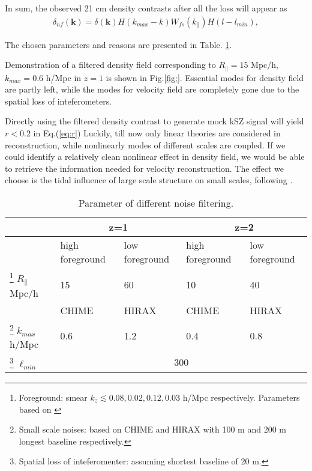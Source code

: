 In sum, the observed 21 cm density contrasts after all the loss will appear as 
\begin{eqnarray}
\label{eq:ns}
    \delta_{nf}(\bm{k})=\delta(\bm{k})H(k_{max}-k)W_{fs}(k_\parallel)H(l-l_{min}),
\end{eqnarray}

The chosen parameters and reasons are presented in Table. \ref{tab:para}.

Demonstration of a filtered density field corresponding to 
$R_\parallel=15$ Mpc/h, $k_{max}=0.6$ h/Mpc 
in $z=1$ is shown in Fig.\ref{fig:}. 
Essential modes for density field are partly left,  
while the modes for velocity field are completely gone 
due to the spatial loss of inteferometers. 

Directly using the filtered density contrast to 
generate mock kSZ signal will yield $r<0.2$ in Eq.(\ref{eq:r}) 
Luckily, till now only linear theories are considered in reconstruction, 
while nonlinearly modes of different scales are coupled. 
If we could identify a relatively clean nonlinear effect in density field, 
we would be able to retrieve the information needed for velocity reconstruction. 
The effect we choose is the tidal influence of large scale structure on small 
scales, following \cite{2015:zhu,2012:pen}.  






\begin{table}
\begin{tabular}{|m{2cm}|m{1.5cm}|m{1.5cm}|m{1.5cm}|m{1.5cm}|}
    \hline
     & \multicolumn{2}{|c|}{z=1} &\multicolumn{2}{|c|}{z=2}\\
     \hline
     & high foreground &low foreground&high foreground& low foreground\\
     \cline{2-5}
     \footnote{Foreground: smear $k_z\lesssim 0.08,0.02,0.12,0.03$ h/Mpc respectively. Parameters based on \cite{2013ApJ...763L..20M,Switzer13,15Shaw}}
     $R_\parallel$ Mpc/h
      & 15 & 60 & 10 & 40 \\
     \hline
     & CHIME & HIRAX & CHIME &HIRAX\\
     \cline{2-5}
     \footnote{Small scale noises: based on CHIME\cite{2014CHIME} and HIRAX\cite{HIRAX} 
     with 100 m and 200 m longest baseline respectively.}
     $k_{max}$ h/Mpc 
     & 0.6 & 1.2 & 0.4 & 0.8 \\
     \hline
     \footnote{Spatial loss of inteferomenter: assuming shortest baseline of 20 m.}
     $\ell_{min}$
     & \multicolumn{4}{|c|}{300} \\
     \hline
\end{tabular}
     \caption{Parameter of different noise filtering.}
     \label{tab:para}
\end{table}
